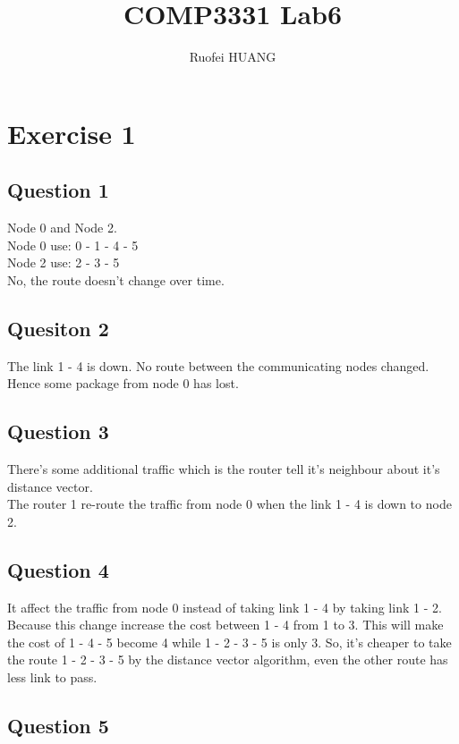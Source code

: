 \documentclass{article}
\begin{document}
\title{COMP3331 Lab6}
\author{Ruofei HUANG}

\maketitle

\section{Exercise 1}
\subsection{Question 1}

Node 0 and Node 2. \\
Node 0 use: 0 - 1 - 4 - 5\\
Node 2 use: 2 - 3 - 5 \\
No, the route doesn't change over time.

\subsection{Quesiton 2}

The link 1 - 4 is down. No route between the communicating nodes changed. Hence some package from node 0 has lost.

\subsection{Question 3}

There's some additional traffic which is the router tell it's neighbour about it's distance vector. \\
The router 1 re-route the traffic from node 0 when the link 1 - 4 is down to node 2. 

\subsection{Question 4}

It affect the traffic from node 0 instead of taking link 1 - 4 by taking link 1 - 2. Because this change increase the cost between 1 - 4 from 1 to 3. This will make the cost of 1 - 4 - 5 become 4 while 1 - 2 - 3 - 5 is only 3. So, it's cheaper to take the route 1 - 2 - 3 - 5 by the distance vector algorithm, even the other route has less link to pass.

\subsection{Question 5}
\end{document}
